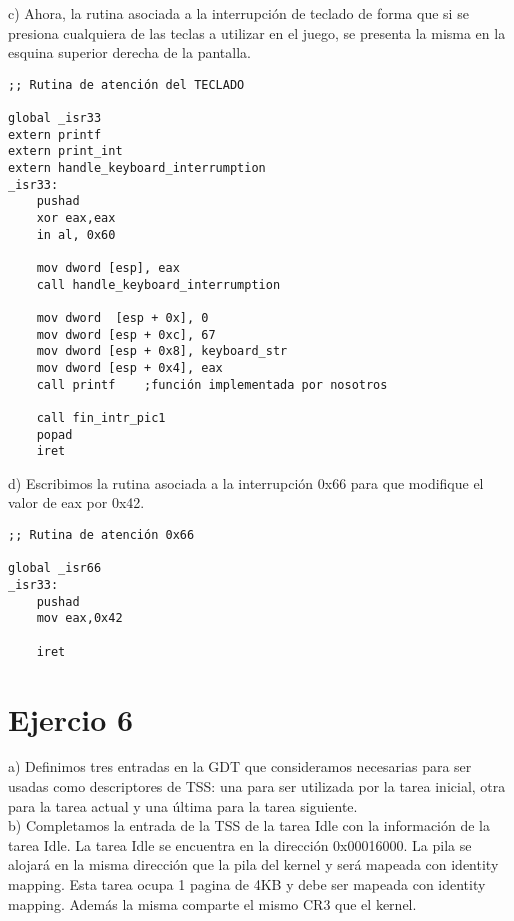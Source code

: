 \documentclass[a4paper]{article}
\begin{document}
{\large c)} Ahora, la rutina asociada a la interrupci\'on de teclado de forma que si se presiona cualquiera
de las teclas a utilizar en el juego, se presenta la misma en la esquina superior derecha de la pantalla. \\

\begin{codesnippet}
\begin{verbatim}
;; Rutina de atención del TECLADO

global _isr33
extern printf
extern print_int
extern handle_keyboard_interrumption
_isr33:
    pushad
    xor eax,eax
    in al, 0x60

    mov dword [esp], eax
    call handle_keyboard_interrumption
    
    mov dword  [esp + 0x], 0
    mov dword [esp + 0xc], 67
    mov dword [esp + 0x8], keyboard_str
    mov dword [esp + 0x4], eax
    call printf    ;función implementada por nosotros

    call fin_intr_pic1
    popad
    iret
\end{verbatim}
\end{codesnippet}


{\large d)} Escribimos la rutina asociada a la interrupci\'on 0x66 para que modifique el valor de eax por
0x42. 
\begin{codesnippet}
\begin{verbatim}
;; Rutina de atención 0x66

global _isr66
_isr33:
    pushad
    mov eax,0x42
  
    iret
\end{verbatim}
\end{codesnippet}

\newpage
\section{Ejercio 6}
{\large a)} Definimos tres entradas en la GDT que consideramos necesarias para ser usadas como descriptores
de TSS: una para ser utilizada por la tarea inicial, otra para la tarea actual y una \'ultima para la tarea siguiente.\\

{\large b)} Completamos la entrada de la TSS de la tarea Idle con la informaci\'on de la tarea Idle. La tarea Idle se encuentra en la direcci\'on 0x00016000. La pila se alojar\'a en la misma direcci\'on que la pila del kernel y ser\'a mapeada
con identity mapping. Esta tarea ocupa 1 pagina de 4KB y debe ser mapeada con identity mapping. Adem\'as la misma comparte el mismo CR3 que el kernel. \\
\end{document}
